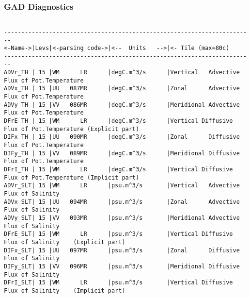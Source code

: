 \subsubsection{GAD Diagnostics}
\label{sec:pkg:gad:diagnostics}

\begin{verbatim}

------------------------------------------------------------------------
<-Name->|Levs|<-parsing code->|<--  Units   -->|<- Tile (max=80c) 
------------------------------------------------------------------------
ADVr_TH | 15 |WM      LR      |degC.m^3/s      |Vertical   Advective Flux of Pot.Temperature
ADVx_TH | 15 |UU   087MR      |degC.m^3/s      |Zonal      Advective Flux of Pot.Temperature
ADVy_TH | 15 |VV   086MR      |degC.m^3/s      |Meridional Advective Flux of Pot.Temperature
DFrE_TH | 15 |WM      LR      |degC.m^3/s      |Vertical Diffusive Flux of Pot.Temperature (Explicit part)
DIFx_TH | 15 |UU   090MR      |degC.m^3/s      |Zonal      Diffusive Flux of Pot.Temperature
DIFy_TH | 15 |VV   089MR      |degC.m^3/s      |Meridional Diffusive Flux of Pot.Temperature
DFrI_TH | 15 |WM      LR      |degC.m^3/s      |Vertical Diffusive Flux of Pot.Temperature (Implicit part)
ADVr_SLT| 15 |WM      LR      |psu.m^3/s       |Vertical   Advective Flux of Salinity
ADVx_SLT| 15 |UU   094MR      |psu.m^3/s       |Zonal      Advective Flux of Salinity
ADVy_SLT| 15 |VV   093MR      |psu.m^3/s       |Meridional Advective Flux of Salinity
DFrE_SLT| 15 |WM      LR      |psu.m^3/s       |Vertical Diffusive Flux of Salinity    (Explicit part)
DIFx_SLT| 15 |UU   097MR      |psu.m^3/s       |Zonal      Diffusive Flux of Salinity
DIFy_SLT| 15 |VV   096MR      |psu.m^3/s       |Meridional Diffusive Flux of Salinity
DFrI_SLT| 15 |WM      LR      |psu.m^3/s       |Vertical Diffusive Flux of Salinity    (Implicit part)
\end{verbatim}


